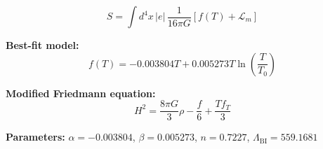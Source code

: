 
\begin{equation}
  S = \int d^4x \, |e| \, \frac{1}{16\pi G} \left[ f(T) + \mathcal{L}_m \right]
\end{equation}

\textbf{Best-fit model:}
\begin{equation}
  f(T) = -0.003804 T + 0.005273 T \ln\!\left(\frac{T}{T_0}\right)
\end{equation}

\textbf{Modified Friedmann equation:}
\begin{equation}
  H^2 = \frac{8\pi G}{3} \rho - \frac{f}{6} + \frac{T f_T}{3}
\end{equation}

\textbf{Parameters:}
$\alpha = -0.003804$, \quad
$\beta = 0.005273$, \quad
$n = 0.7227$, \quad
$\Lambda_{\text{BI}} = 559.1681$